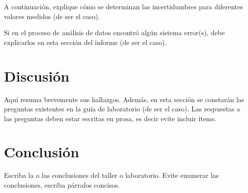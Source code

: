 \documentclass[10pt, oneside,spanish]{article}   	%
\begin{document}
A continuación, explique cómo se determinan las incertidumbres para diferentes
valores medidos (de ser el caso).

Si en el proceso de análisis de datos encontró algún sistema error(s), debe explicarlos en esta sección del informe (de ser el caso). 

\section{Discusión}
Aquí resuma brevemente sus hallazgos. Además, en esta sección se constarán las preguntas existentes en la guía de laboratorio (de ser el caso). Las respuestas a las preguntas deben estar escritas en prosa, es decir evite incluir ítems.

\section{Conclusión}
Escriba la o las conclusiones del taller o laboratorio. Evite enumerar las conclusiones, escriba párrafos concisos.

\nocite{*}


\end{document}
